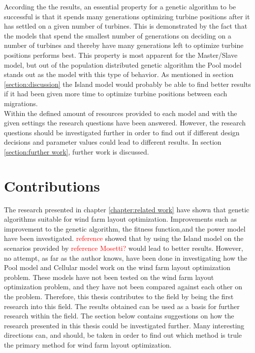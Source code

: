 \noindent According the the results, an essential property for a genetic algorithm to be successful is that it spends many generations optimizing turbine positions after it has settled on a given number of turbines. This is demonstrated by the fact that the models that spend the smallest number of generations on deciding on a number of turbines and thereby have many generations left to optimize turbine positions performs best. This property is most apparent for the Master/Slave model, but out of the population distributed genetic algorithm the Pool model stands out as the model with this type of behavior. As mentioned in section \ref{section:discussion} the Island model would probably be able to find better results if it had been given more time to optimize turbine positions between each migrations. \\ 


\noindent Within the defined amount of resources provided to each model and with the given settings the research questions have been answered. However, the research questions should be investigated further in order to find out if different design decisions and parameter values could lead to different results. In section \ref{section:further work}, further work is discussed. \\


\section{Contributions}
The research presented in chapter \ref{chapter:related work} have shown that genetic algorithms suitable for wind farm layout optimization. Improvements such as improvement to the genetic algorithm, the fitness function,and the power model have been investigated. \textcolor{red}{reference} showed that by using the Island model on the scenarios provided by \textcolor{red}{reference Mosetti?} would lead to better results. However, no attempt, as far as the author knows, have been done in investigating how the Pool model and Cellular model work on the wind farm layout optimization problem. These models have not been tested on the wind farm layout optimization problem, and they have not been compared against each other on the problem. Therefore, this thesis contributes to the field by being the first research into this field. The results obtained can be used as a basis for further research within the field. The section below contains suggestions on how the research presented in this thesis could be investigated further. Many interesting directions can, and should, be taken in order to find out which method is trule the primary method for wind farm layout optimization.\\


